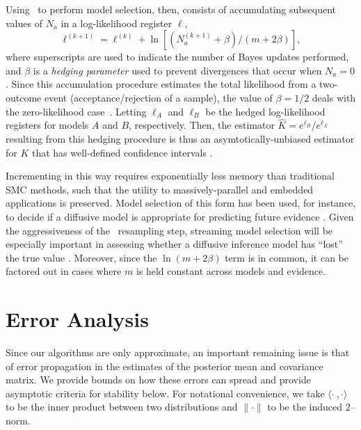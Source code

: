 \documentclass[twoside]{article}
\newcommand{\CRej}{\text{rejection filtering}}
\begin{document}
Using \CRej~to perform model selection, then, consists of accumulating
subsequent values of $N_a$ in a log-likelihood register $\ell$,
\begin{equation}
    \ell^{(k + 1)} = \ell^{(k)} + \ln\left[(N_a^{(k + 1)} + \beta) / (m + 2 \beta)\right],
\end{equation}
where superscripts are used to indicate the number of Bayes updates performed,
and  $\beta$ is a \emph{hedging parameter} used to prevent
divergences that occur when $N_a = 0$. Since this accumulation procedure
estimates the total likelihood from a two-outcome event
(acceptance/rejection of a sample), the value of $\beta = 1 / 2$ deals with the zero-likelihood case~\cite{ferrie_estimating_2012}.
Letting $\ell_A$ and $\ell_B$ be the hedged log-likelihood registers for models $A$ and $B$,
respectively. Then, the estimator $\hat{K} = e^{\ell_B} / e^{\ell_A}$ resulting from this hedging procedure
is thus an asymtotically-unbiased estimator for $K$ that has well-defined
confidence intervals \cite{cho_approximate_2013}.


Incrementing in this way requires exponentially less memory than traditional SMC methods, such that the utility
to massively-parallel and embedded applications is preserved.
Model selection of this form has been used, for instance, to decide if
a diffusive model is appropriate for predicting future evidence \cite{granade_characterization_2015}.
Given the aggressiveness of the \CRej~resampling step, streaming model selection
will be especially important in assessing whether a diffusive inference model has
``lost'' the true value \cite{wiebe_efficient_2015}. Moreover, since the $\ln(m + 2\beta)$ term is in common,
it can be factored out in cases where $m$ is held constant across models and evidence.

\section{Error Analysis}
\label{sec:error-analysis}

Since our algorithms are only approximate, an important remaining issue is that of error propagation in the estimates of the posterior mean
and covariance matrix.  We provide bounds on how these errors can spread and provide asymptotic criteria for stability below.  For notational convenience,
we take $\langle \cdot\!~,\cdot \rangle$ to be the inner product between two distributions and $\|\cdot\|$ to be the induced $2$--norm.
\end{document}
